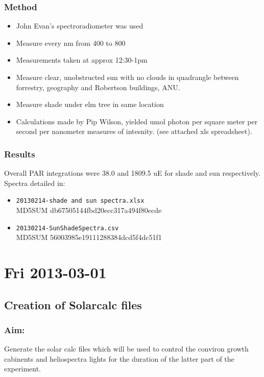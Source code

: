 \documentclass[12pt,a4paper]{book}
\begin{document}
    \subsection*{Method}
      \begin{itemize} \itemsep1pt \parskip0pt 
        \item John Evan's spectroradiometer was used
        \item Measure every nm from 400 to 800
        \item Measurements taken at approx 12:30-1pm
        \item Measure clear, unobstructed sun with no clouds in quadrangle between forrestry,
          geography and Robertson buildings, ANU.
        \item Measure shade under elm tree in same location
        \item Calculations made by Pip Wilson, yielded umol photon per square meter per second per
          nanometer measures of intesnity. (see attached xls spreadsheet).
      \end{itemize}
    \subsection*{Results}
      Overall PAR integrations were 38.0 and 1809.5 uE for shade and sun respectively.\\
      Spectra detailed in:
      \begin{itemize} \itemsep1pt \parskip0pt 
          \item \verb+20130214-shade and sun spectra.xlsx+\\
            MD5SUM db67505144fbd20ecc317a494f80ecde
          \item \verb+20130214-SunShadeSpectra.csv+\\
            MD5SUM 56003985e19111288384dcd5f4dc51f1
      \end{itemize}

\chapter*{Fri 2013-03-01}
  \section*{Creation of Solarcalc files}
    \subsection*{Aim:}
      Generate the solar calc files which will be used to control the conviron growth cabinents and
      heliospectra lights for the duration of the latter part of the experiment.
\end{document}
